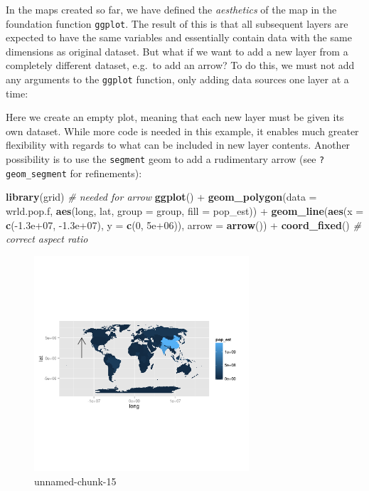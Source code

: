 \documentclass[]{article}
\newenvironment{Shaded}{}{}
\newcommand{\KeywordTok}[1]{\textcolor[rgb]{0.00,0.44,0.13}{\textbf{{#1}}}}
\newcommand{\DataTypeTok}[1]{\textcolor[rgb]{0.56,0.13,0.00}{{#1}}}
\newcommand{\DecValTok}[1]{\textcolor[rgb]{0.25,0.63,0.44}{{#1}}}
\newcommand{\FloatTok}[1]{\textcolor[rgb]{0.25,0.63,0.44}{{#1}}}
\newcommand{\CommentTok}[1]{\textcolor[rgb]{0.38,0.63,0.69}{\textit{{#1}}}}
\newcommand{\NormalTok}[1]{{#1}}
\let\Oldincludegraphics\includegraphics
\renewcommand{\includegraphics}[1]{\Oldincludegraphics[width=8cm]{#1}}
\begin{document}
In the maps created so far, we have defined the \emph{aesthetics} of the
map in the foundation function \texttt{ggplot}. The result of this is
that all subsequent layers are expected to have the same variables and
essentially contain data with the same dimensions as original dataset.
But what if we want to add a new layer from a completely different
dataset, e.g.~to add an arrow? To do this, we must not add any arguments
to the \texttt{ggplot} function, only adding data sources one layer at a
time:

Here we create an empty plot, meaning that each new layer must be given
its own dataset. While more code is needed in this example, it enables
much greater flexibility with regards to what can be included in new
layer contents. Another possibility is to use the \texttt{segment} geom
to add a rudimentary arrow (see \texttt{?geom\_segment} for
refinements):

\begin{Shaded}
\begin{Highlighting}[]
\KeywordTok{library}\NormalTok{(grid)  }\CommentTok{# needed for arrow}
\KeywordTok{ggplot}\NormalTok{() + }\KeywordTok{geom_polygon}\NormalTok{(}\DataTypeTok{data =} \NormalTok{wrld.pop.f, }\KeywordTok{aes}\NormalTok{(long, lat, }\DataTypeTok{group =} \NormalTok{group, }\DataTypeTok{fill =} \NormalTok{pop_est)) + }
    \KeywordTok{geom_line}\NormalTok{(}\KeywordTok{aes}\NormalTok{(}\DataTypeTok{x =} \KeywordTok{c}\NormalTok{(-}\FloatTok{1.3e+07}\NormalTok{, -}\FloatTok{1.3e+07}\NormalTok{), }\DataTypeTok{y =} \KeywordTok{c}\NormalTok{(}\DecValTok{0}\NormalTok{, }\FloatTok{5e+06}\NormalTok{)), }\DataTypeTok{arrow =} \KeywordTok{arrow}\NormalTok{()) + }
    \KeywordTok{coord_fixed}\NormalTok{()  }\CommentTok{# correct aspect ratio}
\end{Highlighting}
\end{Shaded}
\begin{figure}[htbp]
\centering
\includegraphics{figure/unnamed-chunk-15.png}
\caption{unnamed-chunk-15}
\end{figure}
\end{document}
